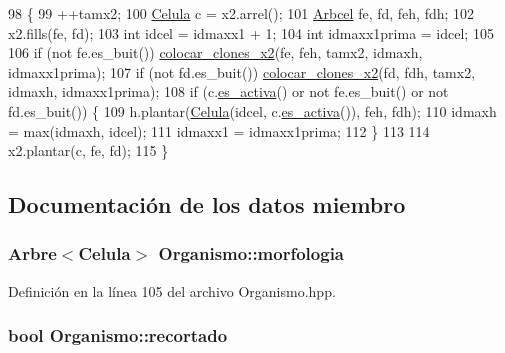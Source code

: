 \begin{DoxyCode}
98                                                                                          \{
99     ++tamx2;
100     \hyperlink{class_celula}{Celula} c = x2.arrel();
101     \hyperlink{class_organismo_a6d28459b85f211994ba446ba304fa141}{Arbcel} fe, fd, feh, fdh;
102     x2.fills(fe, fd);
103     \textcolor{keywordtype}{int} idcel = idmaxx1 + 1;
104     \textcolor{keywordtype}{int} idmaxx1prima = idcel;
105 
106     \textcolor{keywordflow}{if} (not fe.es\_buit()) \hyperlink{class_organismo_a2614d55b5ce001c216fc24c2eed9bfef}{colocar\_clones\_x2}(fe, feh, tamx2, idmaxh, idmaxx1prima);
107     \textcolor{keywordflow}{if} (not fd.es\_buit()) \hyperlink{class_organismo_a2614d55b5ce001c216fc24c2eed9bfef}{colocar\_clones\_x2}(fd, fdh, tamx2, idmaxh, idmaxx1prima);
108     \textcolor{keywordflow}{if} (c.\hyperlink{class_celula_a25bbae8df2eb0b60202829321175e3f7}{es\_activa}() or not fe.es\_buit() or not fd.es\_buit()) \{
109         h.plantar(\hyperlink{class_celula}{Celula}(idcel, c.\hyperlink{class_celula_a25bbae8df2eb0b60202829321175e3f7}{es\_activa}()), feh, fdh);
110         idmaxh = max(idmaxh, idcel);
111         idmaxx1 = idmaxx1prima;
112     \}
113 
114     x2.plantar(c, fe, fd);
115 \}
\end{DoxyCode}


\subsection{Documentación de los datos miembro}
\hypertarget{class_organismo_a6139c2cd4bf552831772ec94b36fcf39}{
\subsubsection[{morfologia}]{\setlength{\rightskip}{0pt plus 5cm}Arbre$<${\bf Celula}$>$ Organismo\-::morfologia\hspace{0.3cm}{\ttfamily [private]}}}\label{class_organismo_a6139c2cd4bf552831772ec94b36fcf39}


Definición en la línea 105 del archivo Organismo.\-hpp.

\hypertarget{class_organismo_ab191bedf8c3fb1e6e21e0d69dd35437f}{
\subsubsection[{recortado}]{\setlength{\rightskip}{0pt plus 5cm}bool Organismo\-::recortado\hspace{0.3cm}{\ttfamily [private]}}}\label{class_organismo_ab191bedf8c3fb1e6e21e0d69dd35437f}


